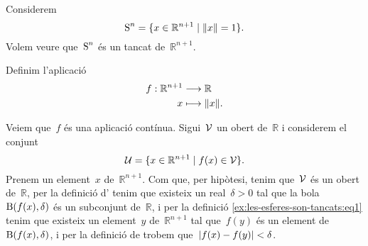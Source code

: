 \documentclass[../../main.tex]{subfiles}
\begin{document}
    \begin{example}
        \label{ex:les-esferes-son-tancats}
        Considerem
        \[
            \esfera^{n}=\{x\in\mathbb{R}^{n+1}\mid\norm{x}=1\}.
        \]
        Volem veure que~\(\operatorname{S}^{n}\) és un tancat de~\(\mathbb{R}^{n+1}\).
    \end{example}
    \begin{solution}
        Definim l'aplicació
        \begin{align*}
            f:\mathbb{R}^{n+1}&\longrightarrow\mathbb{R} \\
            x&\longmapsto\norm{x}.
        \end{align*}
        \begin{comment}
            Veiem que~\(f\) és una aplicació tancada.
            Sigui~\(\tancat{C}\) un tancat de~\(\mathbb{R}^{n+1}\) i considerem el conjunt
            \[
                \tancat{K}=\{f(x)\in\mathbb{R}\mid x\in\tancat{C}\}.
            \]
            Tenim que~\(\tancat{K}\) és un tancat de~\(\mathbb{R}\), ja que si~\(y\) és un element de~\(\tancat{K}\), aleshores~\(y\neq f(x)\) per a tot~\(x\) de~\(\obert{C}\), i per tant existeix un real~\(d>0\) tal que
            \[
                d=\min_{x\in\tancat{C}}\abs{f(x)-y},
            \]
            i per tant tenim que per a tot~\(y\) de~\(\mathbb{R}\setminus\tancat{K}\) existeix una bola~\(\bola(y,d)\) tal que~\(\bola(y,d)\cap\tancat{K}=\emptyset\), i per la definició d'\myref{def:obert-espai-metric} trobem que~\(\mathbb{R}\setminus\tancat{K}\) és un obert de~\(\mathbb{R}\).
            Aleshores per la definició de \myref{def:tancat} trobem que~\(\tancat{K}\) és un tancat, i per la definició d'\myref{def:aplicacio-tancada} trobem que~\(f\) és una aplicació tancada.

            Ara bé, tenim que~\(\{1\}\) és un tancat de~\(\mathbb{R}\)
        \end{comment}
        Veiem que~\(f\) és una aplicació contínua.
        Sigui~\(\mathcal{V}\) un obert de~\(\mathbb{R}\) i considerem el conjunt
        \begin{equation}
            \label{ex:les-esferes-son-tancats:eq1}
            \mathcal{U}=\{x\in\mathbb{R}^{n+1}\mid f(x)\in\mathcal{V}\}.
        \end{equation}
        Prenem un element~\(x\) de~\(\mathbb{R}^{n+1}\).
        Com que, per hipòtesi, tenim que~\(\mathcal{V}\) és un obert de~\(\mathbb{R}\), per la definició d' tenim que existeix un real~\(\delta>0\) tal que la bola~\(\operatorname{B}(f(x),\delta)\) és un subconjunt de~\(\mathbb{R}\), i per la definició \eqref{ex:les-esferes-son-tancats:eq1} tenim que existeix un element~\(y\) de~\(\mathbb{R}^{n+1}\) tal que~\(f(y)\) és un element de~\(\operatorname{B}(f(x),\delta)\), i per la definició de  trobem que~\(\abs{f(x)-f(y)}<\delta\).
    \end{solution}
\end{document}
